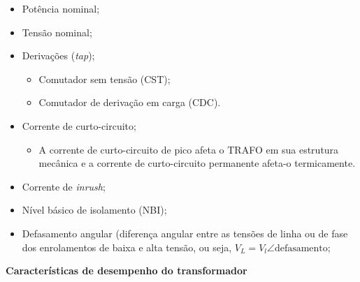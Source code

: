 \begin{itemize}
    \item Potência nominal;
    \item Tensão nominal;
    \item Derivações (\textit{tap});
    \begin{itemize}
        \item Comutador sem tensão (CST);
        \item Comutador de derivação em carga (CDC).
    \end{itemize}
    \item Corrente de curto-circuito;
    \begin{itemize}
        \item A corrente de curto-circuito de pico afeta o TRAFO em sua estrutura mecânica e a corrente de curto-circuito permanente afeta-o termicamente.
    \end{itemize}
    \item Corrente de \textit{inrush};
    \item Nível básico de isolamento (NBI);
    \item Defasamento angular (diferença angular entre as tensões de linha ou de fase dos enrolamentos de baixa e alta tensão, ou seja, $V_L = V_l \angle{\text{defasamento}}$;
    
\end{itemize}

\textbf{Características de desempenho do transformador}

